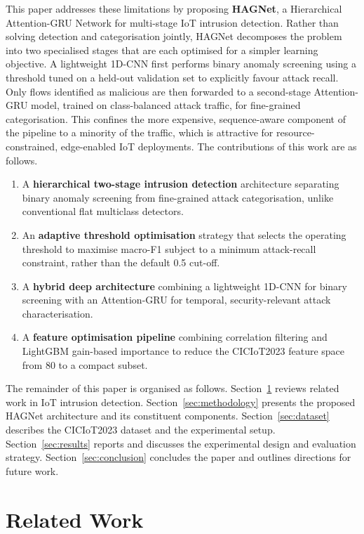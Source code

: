 \documentclass{llncs}
\begin{document}
This paper addresses these limitations by proposing \textbf{HAGNet}, a Hierarchical Attention-GRU Network for multi-stage IoT intrusion detection. Rather than solving detection and categorisation jointly, HAGNet decomposes the problem into two specialised stages that are each optimised for a simpler learning objective. A lightweight 1D-CNN first performs binary anomaly screening using a threshold tuned on a held-out validation set to explicitly favour attack recall. Only flows identified as malicious are then forwarded to a second-stage Attention-GRU model, trained on class-balanced attack traffic, for fine-grained categorisation. This confines the more expensive, sequence-aware component of the pipeline to a minority of the traffic, which is attractive for resource-constrained, edge-enabled IoT deployments. The contributions of this work are as follows.
\begin{enumerate}
    \item A \textbf{hierarchical two-stage intrusion detection} architecture separating binary anomaly screening from fine-grained attack categorisation, unlike conventional flat multiclass detectors.
    \item An \textbf{adaptive threshold optimisation} strategy that selects the operating threshold to maximise macro-F1 subject to a minimum attack-recall constraint, rather than the default 0.5 cut-off.
    \item A \textbf{hybrid deep architecture} combining a lightweight 1D-CNN for binary screening with an Attention-GRU for temporal, security-relevant attack characterisation.
    \item A \textbf{feature optimisation pipeline} combining correlation filtering and LightGBM gain-based importance to reduce the CICIoT2023 feature space from 80 to a compact subset.
\end{enumerate}

The remainder of this paper is organised as follows. Section~\ref{sec:related} reviews related work in IoT intrusion detection. Section~\ref{sec:methodology} presents the proposed HAGNet architecture and its constituent components. Section~\ref{sec:dataset} describes the CICIoT2023 dataset and the experimental setup. Section~\ref{sec:results} reports and discusses the experimental design and evaluation strategy. Section~\ref{sec:conclusion} concludes the paper and outlines directions for future work.

\section{Related Work}
\label{sec:related}
\end{document}
